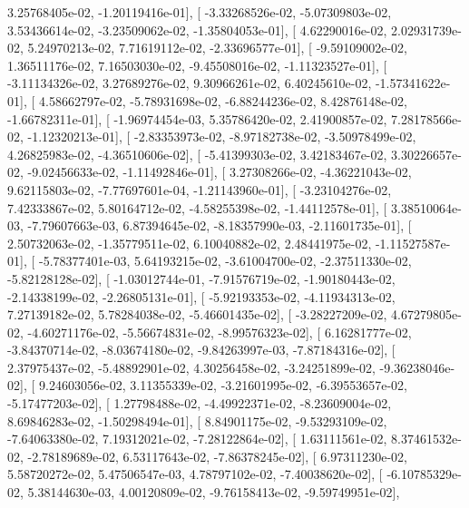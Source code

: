 \documentclass{article}
\begin{document}
          3.25768405e-02,  -1.20119416e-01],
       [ -3.33268526e-02,  -5.07309803e-02,   3.53436614e-02,
         -3.23509062e-02,  -1.35804053e-01],
       [  4.62290016e-02,   2.02931739e-02,   5.24970213e-02,
          7.71619112e-02,  -2.33696577e-01],
       [ -9.59109002e-02,   1.36511176e-02,   7.16503030e-02,
         -9.45508016e-02,  -1.11323527e-01],
       [ -3.11134326e-02,   3.27689276e-02,   9.30966261e-02,
          6.40245610e-02,  -1.57341622e-01],
       [  4.58662797e-02,  -5.78931698e-02,  -6.88244236e-02,
          8.42876148e-02,  -1.66782311e-01],
       [ -1.96974454e-03,   5.35786420e-02,   2.41900857e-02,
          7.28178566e-02,  -1.12320213e-01],
       [ -2.83353973e-02,  -8.97182738e-02,  -3.50978499e-02,
          4.26825983e-02,  -4.36510606e-02],
       [ -5.41399303e-02,   3.42183467e-02,   3.30226657e-02,
         -9.02456633e-02,  -1.11492846e-01],
       [  3.27308266e-02,  -4.36221043e-02,   9.62115803e-02,
         -7.77697601e-04,  -1.21143960e-01],
       [ -3.23104276e-02,   7.42333867e-02,   5.80164712e-02,
         -4.58255398e-02,  -1.44112578e-01],
       [  3.38510064e-03,  -7.79607663e-03,   6.87394645e-02,
         -8.18357990e-03,  -2.11601735e-01],
       [  2.50732063e-02,  -1.35779511e-02,   6.10040882e-02,
          2.48441975e-02,  -1.11527587e-01],
       [ -5.78377401e-03,   5.64193215e-02,  -3.61004700e-02,
         -2.37511330e-02,  -5.82128128e-02],
       [ -1.03012744e-01,  -7.91576719e-02,  -1.90180443e-02,
         -2.14338199e-02,  -2.26805131e-01],
       [ -5.92193353e-02,  -4.11934313e-02,   7.27139182e-02,
          5.78284038e-02,  -5.46601435e-02],
       [ -3.28227209e-02,   4.67279805e-02,  -4.60271176e-02,
         -5.56674831e-02,  -8.99576323e-02],
       [  6.16281777e-02,  -3.84370714e-02,  -8.03674180e-02,
         -9.84263997e-03,  -7.87184316e-02],
       [  2.37975437e-02,  -5.48892901e-02,   4.30256458e-02,
         -3.24251899e-02,  -9.36238046e-02],
       [  9.24603056e-02,   3.11355339e-02,  -3.21601995e-02,
         -6.39553657e-02,  -5.17477203e-02],
       [  1.27798488e-02,  -4.49922371e-02,  -8.23609004e-02,
          8.69846283e-02,  -1.50298494e-01],
       [  8.84901175e-02,  -9.53293109e-02,  -7.64063380e-02,
          7.19312021e-02,  -7.28122864e-02],
       [  1.63111561e-02,   8.37461532e-02,  -2.78189689e-02,
          6.53117643e-02,  -7.86378245e-02],
       [  6.97311230e-02,   5.58720272e-02,   5.47506547e-03,
          4.78797102e-02,  -7.40038620e-02],
       [ -6.10785329e-02,   5.38144630e-03,   4.00120809e-02,
         -9.76158413e-02,  -9.59749951e-02],
\end{document}
